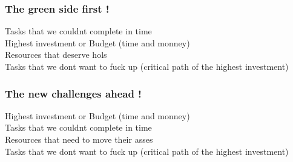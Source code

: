 \documentclass[8pt]{article} %
\begin{document}
%
%

%

%

%

%

%

\subsubsection{The green side first !}
Tasks that we couldnt complete in time\\
Highest investment or Budget (time and monney)\\
Resources that deserve hols\\
Tasks that we dont want to fuck up (critical path of the highest investment)\\

\subsubsection{The new challenges ahead !}
Highest investment or Budget (time and monney)\\
Tasks that we couldnt complete in time\\
Resources that need to move their asses\\
Tasks that we dont want to fuck up (critical path of the highest investment)\\
\end{document}
